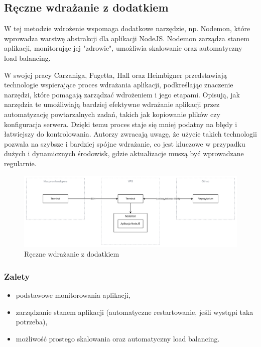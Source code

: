 \documentclass{article}
\begin{document}
\subsection{Ręczne wdrażanie z dodatkiem}

W tej metodzie wdrożenie wspomaga dodatkowe narzędzie, np. Nodemon, które wprowadza warstwę abstrakcji dla aplikacji NodeJS. Nodemon zarządza stanem aplikacji, monitorując jej "zdrowie", umożliwia skalowanie oraz automatyczny load balancing.

W swojej pracy \cite{characterizationFramework} Carzaniga, Fugetta, Hall oraz Heimbigner przedstawiają technologie wspierające proces wdrażania aplikacji, podkreślając znaczenie narzędzi, które pomagają zarządzać wdrożeniem i jego etapami. Opisują, jak narzędzia te umożliwiają bardziej efektywne wdrażanie aplikacji przez automatyzację powtarzalnych zadań, takich jak kopiowanie plików czy konfiguracja serwera. Dzięki temu proces staje się mniej podatny na błędy i łatwiejszy do kontrolowania. Autorzy zwracają uwagę, że użycie takich technologii pozwala na szybsze i bardziej spójne wdrażanie, co jest kluczowe w przypadku dużych i dynamicznych środowisk, gdzie aktualizacje muszą być wprowadzane regularnie.

\begin{figure}[H]
    \centering
    \includegraphics[width=1\linewidth]{reczneWdrazanieZDodatkiem.png}
    \caption{Ręczne wdrażanie z dodatkiem}
    \label{fig:enter-label}
\end{figure}

\subsubsection{Zalety}

\begin{itemize}
    \item podstawowe monitorowania aplikacji,
    \item zarządzanie stanem aplikacji (automatyczne restartowanie, jeśli wystąpi taka potrzeba),
    \item możliwość prostego skalowania oraz automatyczny load balancing.
\end{itemize}
\end{document}
